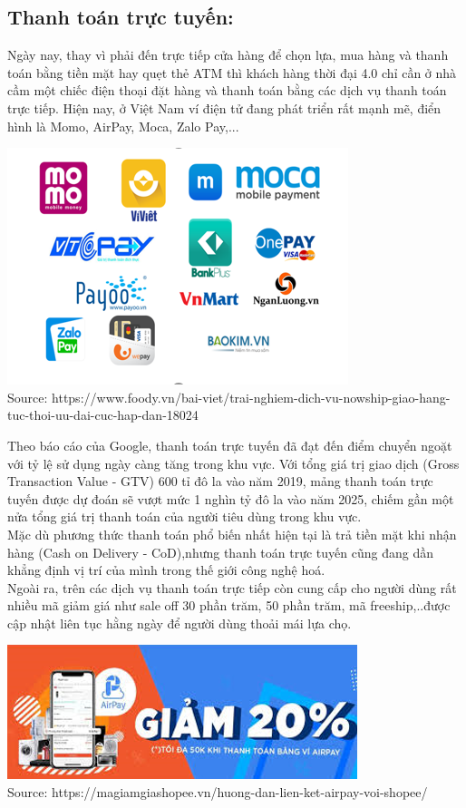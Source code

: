 \documentclass[13pt,a4paper]{article}
\begin{document}
    \subsection{Thanh toán trực tuyến:}
    Ngày nay, thay vì phải đến trực tiếp cửa hàng để chọn lựa, mua hàng và thanh toán bằng tiền mặt hay quẹt thẻ ATM thì khách hàng thời đại 4.0 chỉ cần ở nhà cầm một chiếc điện thoại đặt hàng và thanh toán bằng các dịch vụ thanh toán trực tiếp.
    Hiện nay, ở Việt Nam ví điện tử đang phát triển rất mạnh mẽ, điển hình là Momo, AirPay, Moca, Zalo Pay,...
    \begin{center}
    \includegraphics[scale=1]{images/vi.png} \\
    \fontsize{10pt}{1.2pt}\selectfont
    Source: https://www.foody.vn/bai-viet/trai-nghiem-dich-vu-nowship-giao-hang-tuc-thoi-uu-dai-cuc-hap-dan-18024
    \end{center}
    Theo báo cáo của Google, thanh toán trực tuyến đã đạt đến điểm chuyển ngoặt với tỷ lệ sử dụng ngày càng tăng trong khu vực. Với tổng giá trị giao dịch (Gross Transaction Value - GTV) 600 tỉ đô la vào năm 2019, mảng thanh toán trực tuyến được dự đoán sẽ vượt mức 1 nghìn tỷ đô la vào năm 2025, chiếm gần một nửa tổng giá trị thanh toán của người tiêu dùng trong khu vực. \\
    Mặc dù phương thức thanh toán phổ biến nhất hiện tại là trả tiền mặt khi nhận hàng (Cash on Delivery - CoD),nhưng thanh toán trực tuyến cũng đang dần khẳng định vị trí của mình trong thế giới công nghệ hoá. \\
    Ngoài ra, trên các dịch vụ thanh toán trực tiếp còn cung cấp cho người dùng rất nhiều mã giảm giá như sale off 30 phần trăm, 50 phần trăm, mã freeship,..được cập nhật liên tục hằng ngày để người dùng thoải mái lựa chọ.
    \begin{center}
    \includegraphics[scale=0.98]{images/giam.png} \\
    \fontsize{10pt}{1.2pt}\selectfont
    Source: https://magiamgiashopee.vn/huong-dan-lien-ket-airpay-voi-shopee/
    \end{center}
\end{document}
